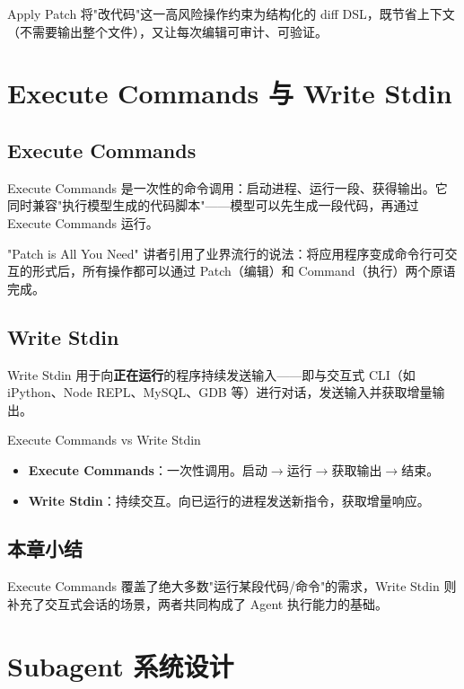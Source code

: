 \documentclass[a4paper]{article}
\begin{document}
Apply Patch 将"改代码"这一高风险操作约束为结构化的 diff DSL，既节省上下文（不需要输出整个文件），又让每次编辑可审计、可验证。


\section{Execute Commands 与 Write Stdin}

\subsection{Execute Commands}

Execute Commands 是一次性的命令调用：启动进程、运行一段、获得输出。它同时兼容"执行模型生成的代码脚本"——模型可以先生成一段代码，再通过 Execute Commands 运行。

\begin{knowledgebox}{"Patch is All You Need"}
讲者引用了业界流行的说法：将应用程序变成命令行可交互的形式后，所有操作都可以通过 Patch（编辑）和 Command（执行）两个原语完成。
\end{knowledgebox}

\subsection{Write Stdin}

Write Stdin 用于向\textbf{正在运行}的程序持续发送输入——即与交互式 CLI（如 iPython、Node REPL、MySQL、GDB 等）进行对话，发送输入并获取增量输出。

\begin{importantbox}{Execute Commands vs Write Stdin}
\begin{itemize}
    \item \textbf{Execute Commands}：一次性调用。启动$\rightarrow$运行$\rightarrow$获取输出$\rightarrow$结束。
    \item \textbf{Write Stdin}：持续交互。向已运行的进程发送新指令，获取增量响应。
\end{itemize}
\end{importantbox}

\subsection{本章小结}

Execute Commands 覆盖了绝大多数"运行某段代码/命令"的需求，Write Stdin 则补充了交互式会话的场景，两者共同构成了 Agent 执行能力的基础。


\section{Subagent 系统设计}
\end{document}
